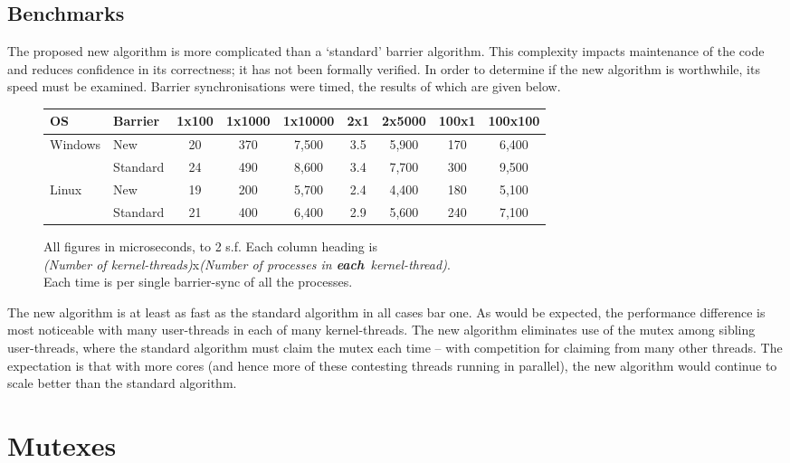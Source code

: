 \documentclass[12pt]{IOS-Book-Article-CPA-2007}
\begin{document}
\subsection{Benchmarks}

The proposed new algorithm is more complicated than a `standard' barrier algorithm.  This complexity impacts maintenance of the code and reduces confidence
in its correctness; it has not been formally verified.  In order to determine if the new algorithm is worthwhile, its speed must be examined.  Barrier synchronisations were timed, the results of which are given below.

\begin{figure}[h]

\begin{tabular}{ll|c|c|c|c|c|c|c}
OS & Barrier & 1x100 & 1x1000 & 1x10000 & 2x1 & 2x5000 & 100x1 & 100x100 \\
\hline
Windows
& New         & 20 & 370 & 7,500 & 3.5 & 5,900 & 170 & 6,400 \\
& Standard    & 24 & 490 & 8,600 & 3.4 & 7,700 & 300 & 9,500 \\
\hline
Linux
& New        & 19 & 200 & 5,700 & 2.4 & 4,400 & 180 & 5,100 \\
& Standard     & 21 & 400 & 6,400 & 2.9 & 5,600 & 240 & 7,100 \\

\end{tabular}

All figures in microseconds, to 2 s.f.  Each column heading is \\ \textit{(Number of kernel-threads)}x\textit{(Number of processes in \textbf{each}~kernel-thread)}.\\
Each time is per single barrier-sync of all the processes.
\end{figure}

The new algorithm is at least as fast as the standard algorithm in all cases bar one.
As would be expected, the performance difference is most noticeable with many user-threads in each of many kernel-threads.  The new algorithm eliminates
use of the mutex among sibling user-threads, where the standard algorithm must claim the mutex each time -- with competition for claiming from many
other threads.  The expectation is that with more cores (and hence more of these contesting threads running in parallel), the new algorithm would 
continue to scale better than the standard algorithm.

\section{Mutexes}
\end{document}
